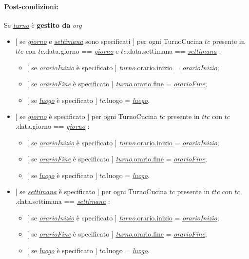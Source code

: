 \paragraph{Post-condizioni:} Se \underline{\textit{turno}} è \textbf{gestito da} {\textit{org}}
 \begin{itemize}
   \item $[$ se \underline{\textit{giorno}} e \underline{\textit{settimana}} sono specificati $]$ \textlangle per ogni TurnoCucina $tc$ presente in $ttc$ con $tc$.data.giorno == \underline{\textit{giorno}} e $tc$.data.settimana == \underline{\textit{settimana}} \textrangle:
\begin{itemize}
  \item $[$ se \underline{\textit{orarioInizio}} è specificato $]$ \underline{\textit{turno}.orario.inizio} = \underline{\textit{orarioInizio}};
    \item $[$ se \underline{\textit{orarioFine}} è specificato $]$ \underline{\textit{turno}.orario.fine} = \underline{\textit{orarioFine}};
  \item $[$ se \underline{\textit{luogo}} è specificato $]$ $tc$.luogo = \underline{\textit{luogo}}.
\end{itemize}
   \item $[$ se \underline{\textit{giorno}} è specificato $]$ \textlangle per ogni TurnoCucina $tc$ presente in $ttc$ con $tc$.data.giorno == \underline{\textit{giorno}} \textrangle:
\begin{itemize}
  \item $[$ se \underline{\textit{orarioInizio}} è specificato $]$ \underline{\textit{turno}.orario.inizio} = \underline{\textit{orarioInizio}};
    \item $[$ se \underline{\textit{orarioFine}} è specificato $]$ \underline{\textit{turno}.orario.fine} = \underline{\textit{orarioFine}};
  \item $[$ se \underline{\textit{luogo}} è specificato $]$ $tc$.luogo = \underline{\textit{luogo}}.
\end{itemize}
   \item $[$ se \underline{\textit{settimana}} è specificato $]$ \textlangle per ogni TurnoCucina $tc$ presente in $ttc$ con $tc$.data.settimana == \underline{\textit{settimana}} \textrangle:
\begin{itemize}
  \item $[$ se \underline{\textit{orarioInizio}} è specificato $]$ \underline{\textit{turno}.orario.inizio} = \underline{\textit{orarioInizio}};
    \item $[$ se \underline{\textit{orarioFine}} è specificato $]$ \underline{\textit{turno}.orario.fine} = \underline{\textit{orarioFine}};
  \item $[$ se \underline{\textit{luogo}} è specificato $]$ $tc$.luogo = \underline{\textit{luogo}}.
\end{itemize}

\end{itemize}

